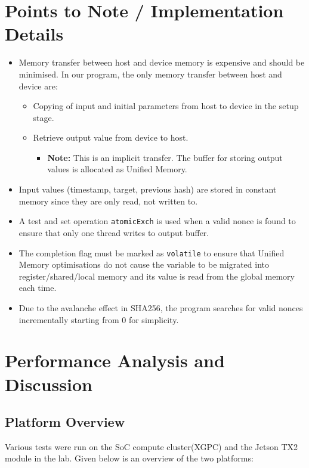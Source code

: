 \documentclass[a4paper,12pt]{article}
\begin{document}
\section{Points to Note / Implementation Details}
\begin{itemize}
	\item Memory transfer between host and device memory is expensive and should be minimised. In our program, the only memory transfer between host and device are:
  \begin{itemize}
    \item Copying of input and initial parameters from host to device in the setup stage.
    \item Retrieve output value from device to host.
    \begin{itemize}
      \item \textbf{Note:} This is an implicit transfer. The buffer for storing output values is allocated as Unified Memory.
    \end{itemize}
  \end{itemize}
  \item Input values (timestamp, target, previous hash) are stored in constant memory since they are only read, not written to.
  \item A test and set operation \texttt{atomicExch} is used when a valid nonce is found to ensure that only one thread writes to output buffer.
  \item The completion flag must be marked as \texttt{volatile} to ensure that Unified Memory optimisations do not cause the variable to be migrated into register/shared/local memory and its value is read from the global memory each time.
  \item Due to the avalanche effect in SHA256, the program searches for valid nonces incrementally starting from 0 for simplicity.
\end{itemize}

\section{Performance Analysis and Discussion}

\subsection{Platform Overview}

Various tests were run on the SoC compute cluster(XGPC) and the Jetson TX2 module in the lab. Given below is an overview of the two platforms:
\end{document}
